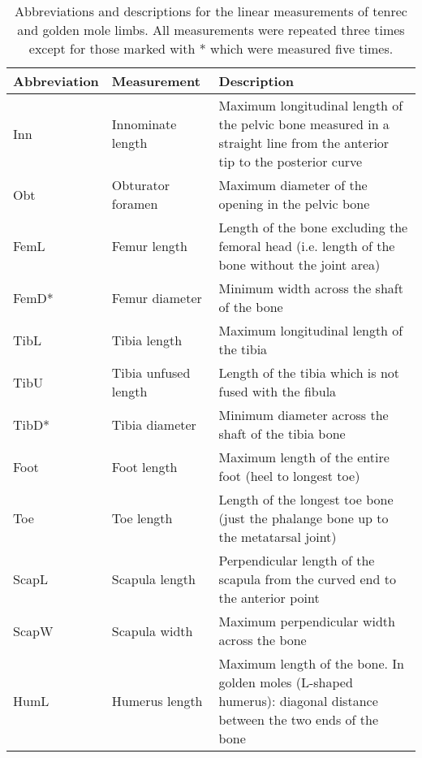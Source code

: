 \begin{center}
\begin{longtable} {p{} p{} p{}}
\caption[Limb measurements] {Abbreviations and descriptions for the linear measurements of tenrec and golden mole limbs. All measurements were repeated three times except for those marked with * which were measured five times.} \\

\hline
\textbf{Abbreviation} & \textbf{Measurement} & \textbf{Description}\\
\hline
Inn & Innominate length & Maximum longitudinal length of the pelvic bone measured in a straight line from the anterior tip to the posterior curve\\ 
Obt & Obturator foramen & Maximum diameter of the opening in the pelvic bone\\
FemL & Femur length & Length of the bone excluding the femoral head (i.e. length of the bone without the joint area)\\
FemD* & Femur diameter & Minimum width across the shaft of the bone\\
TibL & Tibia length & Maximum longitudinal length of the tibia\\
TibU & Tibia unfused length & Length of the tibia which is not fused with the fibula\\
TibD* & Tibia diameter & Minimum diameter across the shaft of the tibia bone\\
Foot & Foot length & Maximum length of the entire foot (heel to longest toe)\\
Toe & Toe length & Length of the longest toe bone (just the phalange bone up to the metatarsal joint)\\
ScapL & Scapula length & Perpendicular length of the scapula from the curved end to the anterior point\\
ScapW & Scapula width & Maximum perpendicular width across the bone\\
HumL & Humerus length & Maximum length of the bone. In golden moles (L-shaped humerus): diagonal distance between the two ends of the bone\\

\end{longtable}
\end{center}
